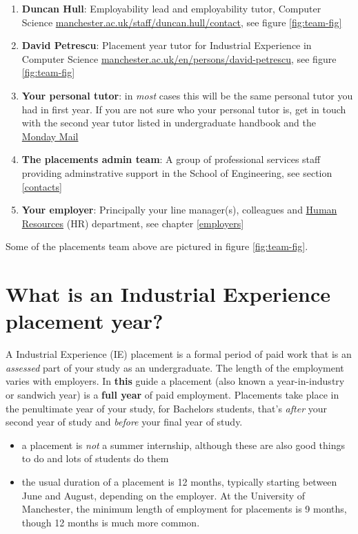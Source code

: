 \documentclass[
]{book}
\providecommand{\tightlist}{%
  \setlength{\itemsep}{0pt}\setlength{\parskip}{0pt}}
\begin{document}
\begin{enumerate}
\def\labelenumi{\arabic{enumi}.}
\tightlist
\item
  \textbf{Duncan Hull}: Employability lead and employability tutor, Computer Science \href{https://personalpages.manchester.ac.uk/staff/duncan.hull/contact}{manchester.ac.uk/staff/duncan.hull/contact}, see figure \ref{fig:team-fig}
\item
  \textbf{David Petrescu}: Placement year tutor for Industrial Experience in Computer Science \href{https://research.manchester.ac.uk/en/persons/david-petrescu}{manchester.ac.uk/en/persons/david-petrescu}, see figure \ref{fig:team-fig}
\item
  \textbf{Your personal tutor}: in \emph{most} cases this will be the same personal tutor you had in first year. If you are not sure who your personal tutor is, get in touch with the second year tutor listed in undergraduate handbook \citep{ughandbook} and the \href{https://studentnet.cs.manchester.ac.uk/ugt/mondaymail/}{Monday Mail} \citep{mondaymail}
\item
  \textbf{The placements admin team}: A group of professional services staff providing adminstrative support in the School of Engineering, see section \ref{contacts}
\item
  \textbf{Your employer}: Principally your line manager(s), colleagues and \href{https://en.wikipedia.org/wiki/Human_resources}{Human Resources} (HR) department, see chapter \ref{employers}
\end{enumerate}

Some of the placements team above are pictured in figure \ref{fig:team-fig}.

\section{What is an Industrial Experience placement year?}\label{placement}

A Industrial Experience (IE) placement is a formal period of paid work that is an \emph{assessed} part of your study as an undergraduate. \citep{whatisie} The length of the employment varies with employers. In \textbf{this} guide a placement (also known a year-in-industry or sandwich year) is a \textbf{full year} of paid employment. Placements take place in the penultimate year of your study, for Bachelors students, that's \emph{after} your second year of study and \emph{before} your final year of study.

\begin{itemize}
\tightlist
\item
  a placement is \emph{not} a summer internship, although these are also good things to do and lots of students do them
\item
  the usual duration of a placement is 12 months, typically starting between June and August, depending on the employer. At the University of Manchester, the minimum length of employment for placements is 9 months, though 12 months is much more common.
\end{itemize}
\end{document}
